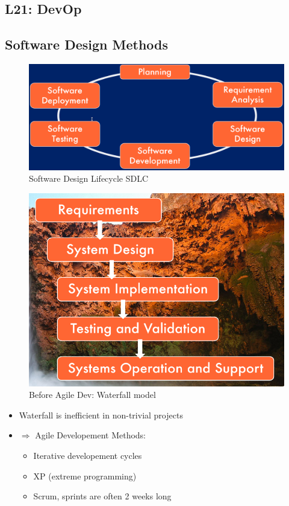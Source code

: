 \documentclass[a4paper]{article}
\begin{document}
\begin{multicols}{3}
\section{L21: DevOp}

\subsection{Software Design Methods}

\begin{figure}[H]
    \includegraphics[width=\linewidth]{SDLC.png}
    \caption{Software Design Lifecycle SDLC}
    \label{fig:sdlc}
\end{figure}

\begin{figure}[H]
    \includegraphics[width=\linewidth]{Waterfallmodel.png}
    \caption{Before Agile Dev: Waterfall model}
    \label{fig:waterfallmodel}
\end{figure}

\begin{itemize}
    \item Waterfall is inefficient in non-trivial projects
    \item $\Rightarrow$ Agile Developement Methods:
        \begin{itemize}
            \item Iterative developement cycles
            \item XP (extreme programming)
            \item Scrum, sprints are often 2 weeks long
        \end{itemize}
\end{itemize}


\end{multicols}
\end{document}
